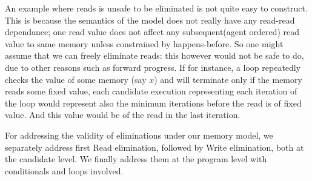     An example where reads is unsafe to be eliminated is not quite easy to construct.
    This is because the semantics of the model does not really have any read-read dependance; one read value does not affect any subsequent(agent ordered) read value to same memory unless constrained by happens-before.
    So one might assume that we can freely eliminate reads: this however would not be safe to do, due to other reasons such as forward progress.
    If for instance, a loop repeatedly checks the value of some memory (say $x$) and will terminate only if the memory reads some fixed value, each candidate execution representing each iteration of the loop would represent also the minimum iterations before the read is of fixed value. 
    And this value would be of the read in the last iteration. 

    For addressing the validity of eliminations under our memory model, we separately address first Read elimination, followed by Write elimination, both at the candidate level. 
    We finally address them at the program level with conditionals and loops involved. 